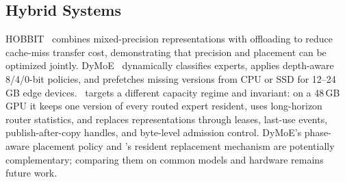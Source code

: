 \subsection{Hybrid Systems}
HOBBIT~\cite{tang2024hobbit} combines mixed-precision representations with offloading to reduce cache-miss transfer cost, demonstrating that precision and placement can be optimized jointly. DyMoE~\cite{huang2026dymoe} dynamically classifies experts, applies depth-aware 8/4/0-bit policies, and prefetches missing versions from CPU or SSD for 12--24\,GB edge devices. \systemname\ targets a different capacity regime and invariant: on a 48\,GB GPU it keeps one version of every routed expert resident, uses long-horizon router statistics, and replaces representations through leases, last-use events, publish-after-copy handles, and byte-level admission control. DyMoE's phase-aware placement policy and \systemname's resident replacement mechanism are potentially complementary; comparing them on common models and hardware remains future work.

